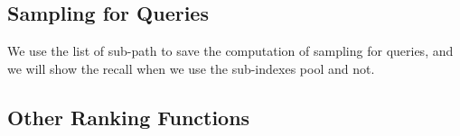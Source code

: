 \documentclass[letterpaper]{article}
\begin{document}
\subsection{Sampling for Queries}
We use the list of sub-path to save the computation of sampling for queries, and we will show the recall when we use the sub-indexes pool and not.

\subsection{Other Ranking Functions}







\end{document}
